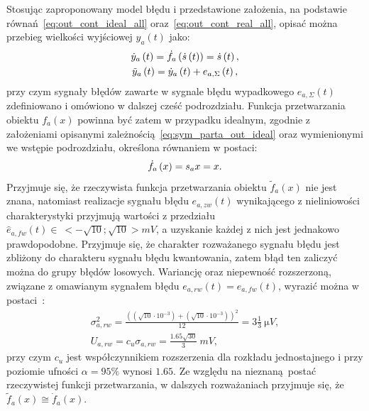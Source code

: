 Stosując zaproponowany model błędu i przedstawione założenia, na podstawie równań~\eqref{eq:out_cont_ideal_all} oraz~\eqref{eq:out_cont_real_all}, opisać można przebieg wielkości wyjściowej $y_{a}(t)$ jako:
\begin{gather}
\dot{y}_{a} \left(t\right) = \dot{f}_{a} \left(\dot{s} \left(t\right)\right) = \dot{s} \left(t\right) \label{eq:sym_parta_out_ideal}, \\
\tilde{y}_{a} \left(t\right) = \dot{y}_{a} \left(t\right) + e_{a,\Sigma} \left(t\right) \label{eq:sym_parta_out_real},
\end{gather}
przy czym sygnały błędów zawarte w sygnale błędu wypadkowego $e_{a,\Sigma}(t)$ zdefiniowano i omówiono w dalszej cześć podrozdziału. Funkcja przetwarzania obiektu $f_{a}(x)$ powinna być zatem w przypadku idealnym, zgodnie z założeniami opisanymi zależnością~\eqref{eq:sym_parta_out_ideal} oraz wymienionymi we wstępie podrozdziału, określona równaniem w postaci:
\begin{equation}
\dot{f}_{a} \left(x\right) = s_{a} x = x \label{eq:sym_parta_statfun}.
\end{equation}
Przyjmuje się, że rzeczywista funkcja przetwarzania obiektu $\tilde{f}_{a}(x)$ nie jest znana, natomiast realizacje sygnału błędu $e_{a,zw}(t)$ wynikającego z nieliniowości charakterystyki przyjmują wartości z przedziału $\hat{e}_{a,fw}(t) \in~<-\sqrt{10};\sqrt{10}>\unit{mV}$, a uzyskanie każdej z nich jest jednakowo prawdopodobne. Przyjmuje się, że charakter rozważanego sygnału błędu jest zbliżony do charakteru sygnału błędu kwantowania, zatem błąd ten zaliczyć można do grupy błędów losowych. Wariancję oraz niepewność rozszerzoną, związane z omawianym sygnałem błędu $e_{a,rw}(t) = e_{a,fw}(t)$, wyrazić można w postaci~\cite{jcgm_guide}:
\begin{gather}
\sigma_{a,rw}^{2} = \frac{\left( \left( \sqrt{10} \cdot 10^{-3} \right) + \left( \sqrt{10} \cdot 10^{-3} \right) \right)^{2}}{12} = 3 \frac{1}{3}~\unit{\micro V} \label{eq:sym_parta_rand_self_var}, \\
U_{a,rw} = c_{u} \sigma_{a,rw} = \frac{1.65 \sqrt{30}}{3}~\unit{mV} \label{eq:sym_parta_rand_self_unc},
\end{gather}
przy czym $c_{u}$ jest współczynnikiem rozszerzenia dla rozkładu jednostajnego i przy poziomie ufności $\alpha = 95\%$ wynosi $1.65$. Ze względu na nieznaną postać rzeczywistej funkcji przetwarzania, w dalszych rozważaniach przyjmuje się, że $\tilde{f}_{a}(x)  \cong  \dot{f}_{a}(x)$.

